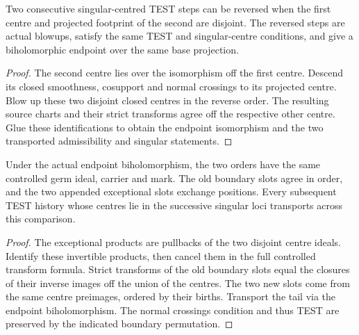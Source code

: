 \begin{theorem}
\label{hir:g8-disjoint-projected-step-exchange}
\leanok
Two consecutive singular-centred TEST steps can be reversed when
the first centre and projected footprint of the second are disjoint.
The reversed steps are actual blowups, satisfy the same TEST and
singular-centre conditions, and give a biholomorphic endpoint over
the same base projection.
\end{theorem}
\begin{proof}
The second centre lies over the isomorphism off the first centre.
Descend its closed smoothness, cosupport and normal crossings to
its projected centre. Blow up these two disjoint closed centres
in the reverse order. The resulting source charts and their strict
transforms agree off the respective other centre. Glue these
identifications to obtain the endpoint isomorphism and the two
transported admissibility and singular statements.
\end{proof}

\begin{theorem}
\label{hir:g8-disjoint-swap-terminal-record}
\leanok
Under the actual endpoint biholomorphism, the two orders have the
same controlled germ ideal, carrier and mark. The old boundary slots
agree in order, and the two appended exceptional slots exchange
positions. Every subsequent TEST history whose centres lie in the
successive singular loci transports across this comparison.
\end{theorem}
\begin{proof}
The exceptional products are pullbacks of the two disjoint
centre ideals. Identify these invertible products, then cancel them
in the full controlled transform formula. Strict transforms of the
old boundary slots equal the closures of their inverse images off
the union of the centres. The two new slots come from the same
centre preimages, ordered by their births. Transport the tail via
the endpoint biholomorphism. The normal crossings condition and
thus TEST are preserved by the indicated boundary permutation.
\end{proof}

